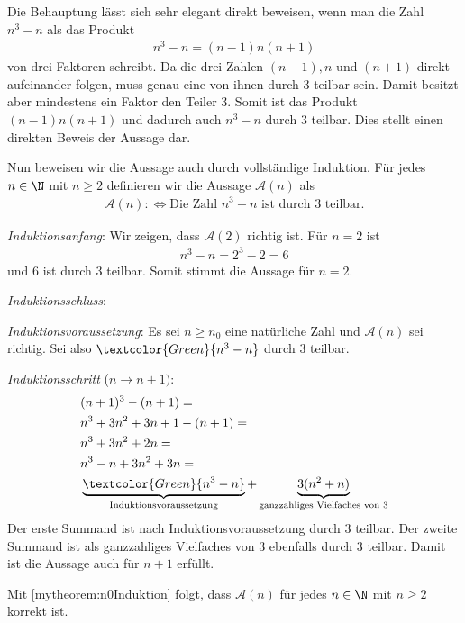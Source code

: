 \clearpage
\begin{myanswer}[myexercise:0205]
	Die Behauptung lässt sich sehr elegant direkt beweisen, wenn man die Zahl $n^3-n$ als das Produkt
	\begin{align*}
		n^3-n = (n-1)n(n+1)
	\end{align*}
	von drei Faktoren schreibt. Da die drei Zahlen $(n-1), n$ und $(n+1)$ direkt aufeinander folgen, muss genau eine von ihnen durch $3$ teilbar sein. Damit besitzt aber mindestens ein Faktor den Teiler $3$. Somit ist das Produkt $(n-1)n(n+1)$ und dadurch auch $n^3-n$ durch $3$ teilbar. Dies stellt einen direkten Beweis der Aussage dar.

	Nun beweisen wir die Aussage auch durch vollständige Induktion. Für jedes $n\in\N$ mit $n\geq 2$ definieren wir die Aussage $\mathcal{A}(n)$ als
	\begin{align*}
		\mathcal{A}(n) :\iff \text{Die Zahl } n^3-n \text{ ist durch $3$ teilbar}.
	\end{align*}
	\begin{aenum}
		\item \textit{Induktionsanfang}: Wir zeigen, dass $\mathcal{A}(2)$ richtig ist. Für $n=2$ ist
		\begin{align*}
			n^3-n = 2^3-2 = 6
		\end{align*}
		und $6$ ist durch $3$ teilbar. Somit stimmt die Aussage für $n=2$.
		\item \textit{Induktionsschluss}:
		\begin{renum}
			\item \textit{Induktionsvoraussetzung}: Es sei $n\geq n_0$ eine natürliche Zahl und $\mathcal{A}(n)$ sei richtig. Sei also $\textcolor{Green}{n^3-n}$ durch $3$ teilbar.
			\item \textit{Induktionsschritt} ($n\to n+1)$:
				\begin{align*}
					 & (n+1)^3-(n+1) =                                                                                                                       \\
					 & n^3+3n^2+3n+1 - (n+1) =                                                                                                               \\
					 & n^3+3n^2+2n =                                                                                                                         \\
					 & n^3-n+3n^2+3n =                                                                                                                       \\
					 & \underbrace{\textcolor{Green}{n^3-n}}_{\text{Induktionsvoraussetzung}}+\underbrace{3(n^2+n)}_{\text{ganzzahliges Vielfaches von $3$}}
				\end{align*}
				Der erste Summand ist nach Induktionsvoraussetzung durch $3$ teilbar. Der zweite Summand ist als ganzzahliges Vielfaches von $3$ ebenfalls durch $3$ teilbar. Damit ist die Aussage auch für $n+1$ erfüllt.
		\end{renum}
	\end{aenum}
	Mit \cref{mytheorem:n0Induktion} folgt, dass $\mathcal{A}(n)$ für jedes $n\in\N$ mit $n\geq 2$ korrekt ist.
\end{myanswer}

